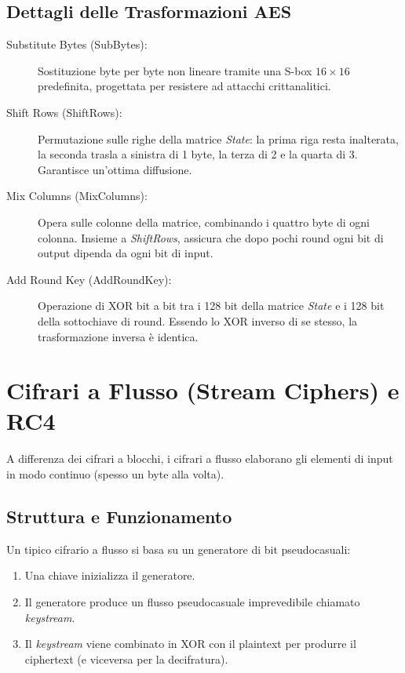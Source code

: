 \subsection{Dettagli delle Trasformazioni AES}
\begin{description}
    \item[Substitute Bytes (SubBytes):] Sostituzione byte per byte non lineare tramite una S-box $16 \times 16$ predefinita, progettata per resistere ad attacchi crittanalitici.
    \item[Shift Rows (ShiftRows):] Permutazione sulle righe della matrice \textit{State}: la prima riga resta inalterata, la seconda trasla a sinistra di 1 byte, la terza di 2 e la quarta di 3. Garantisce un'ottima diffusione.
    \item[Mix Columns (MixColumns):] Opera sulle colonne della matrice, combinando i quattro byte di ogni colonna. Insieme a \textit{ShiftRows}, assicura che dopo pochi round ogni bit di output dipenda da ogni bit di input.
    \item[Add Round Key (AddRoundKey):] Operazione di XOR bit a bit tra i 128 bit della matrice \textit{State} e i 128 bit della sottochiave di round. Essendo lo XOR inverso di se stesso, la trasformazione inversa è identica.
\end{description}

\section{Cifrari a Flusso (Stream Ciphers) e RC4}

A differenza dei cifrari a blocchi, i cifrari a flusso elaborano gli elementi di input in modo continuo (spesso un byte alla volta). 

\subsection{Struttura e Funzionamento}
Un tipico cifrario a flusso si basa su un generatore di bit pseudocasuali:
\begin{enumerate}
    \item Una chiave inizializza il generatore.
    \item Il generatore produce un flusso pseudocasuale imprevedibile chiamato \textit{keystream}.
    \item Il \textit{keystream} viene combinato in XOR con il plaintext per produrre il ciphertext (e viceversa per la decifratura).
\end{enumerate}

